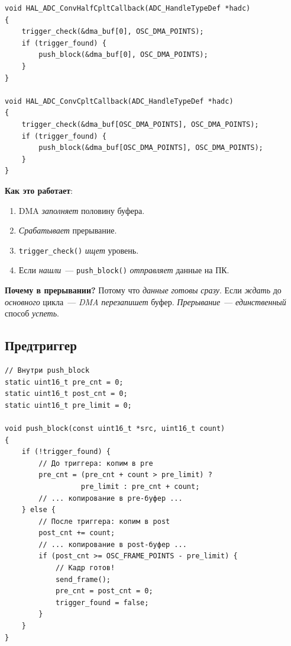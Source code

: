 \begin{listing}[htbp]
\begin{verbatim}
void HAL_ADC_ConvHalfCpltCallback(ADC_HandleTypeDef *hadc)
{
    trigger_check(&dma_buf[0], OSC_DMA_POINTS);
    if (trigger_found) {
        push_block(&dma_buf[0], OSC_DMA_POINTS);
    }
}

void HAL_ADC_ConvCpltCallback(ADC_HandleTypeDef *hadc)
{
    trigger_check(&dma_buf[OSC_DMA_POINTS], OSC_DMA_POINTS);
    if (trigger_found) {
        push_block(&dma_buf[OSC_DMA_POINTS], OSC_DMA_POINTS);
    }
}
\end{verbatim}
\caption{Интеграция триггера с DMA}
\label{lst:trigger-dma}
\end{listing}

\textbf{Как это работает}:
\begin{enumerate}
    \item DMA \emph{заполняет} половину буфера.
    \item \emph{Срабатывает} прерывание.
    \item \texttt{trigger\_check()} \emph{ищет} уровень.
    \item Если \emph{нашли}~--- \texttt{push\_block()} \emph{отправляет}
          данные на ПК.
\end{enumerate}

\begin{keybox}
\textbf{Почему в прерывании?} Потому что \emph{данные}
\emph{готовы} \emph{сразу}. Если \emph{ждать} до
\emph{основного} цикла~--- \emph{DMA} \emph{перезапишет}
буфер. \emph{Прерывание}~--- \emph{единственный} способ
\emph{успеть}.
\end{keybox}

\subsection{Предтриггер}

\begin{listing}[htbp]
\begin{verbatim}
// Внутри push_block
static uint16_t pre_cnt = 0;
static uint16_t post_cnt = 0;
static uint16_t pre_limit = 0;

void push_block(const uint16_t *src, uint16_t count)
{
    if (!trigger_found) {
        // До триггера: копим в pre
        pre_cnt = (pre_cnt + count > pre_limit) ?
                  pre_limit : pre_cnt + count;
        // ... копирование в pre-буфер ...
    } else {
        // После триггера: копим в post
        post_cnt += count;
        // ... копирование в post-буфер ...
        if (post_cnt >= OSC_FRAME_POINTS - pre_limit) {
            // Кадр готов!
            send_frame();
            pre_cnt = post_cnt = 0;
            trigger_found = false;
        }
    }
}
\end{verbatim}
\caption{Предтриггер в \texttt{push\_block()}}
\label{lst:trigger-pretrigger}
\end{listing}

